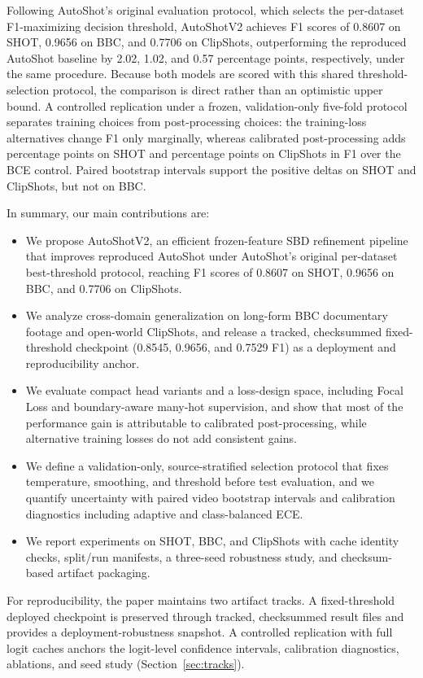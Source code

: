 Following AutoShot's original evaluation protocol, which selects the per-dataset F1-maximizing decision threshold, AutoShotV2 achieves F1 scores of 0.8607 on SHOT, 0.9656 on BBC, and 0.7706 on ClipShots, outperforming the reproduced AutoShot baseline by 2.02, 1.02, and 0.57 percentage points, respectively, under the same procedure. Because both models are scored with this shared threshold-selection protocol, the comparison is direct rather than an optimistic upper bound. A controlled replication under a frozen, validation-only five-fold protocol separates training choices from post-processing choices: the training-loss alternatives change F1 only marginally, whereas calibrated post-processing adds \PaperBFourVsAOneShotPP{} percentage points on SHOT and \PaperBFourVsAOneClipPP{} percentage points on ClipShots in F1 over the BCE control. Paired bootstrap intervals support the positive deltas on SHOT and ClipShots, but not on BBC.

In summary, our main contributions are:
\begin{itemize}
\item We propose AutoShotV2, an efficient frozen-feature SBD refinement pipeline that improves reproduced AutoShot under AutoShot's original per-dataset best-threshold protocol, reaching F1 scores of 0.8607 on SHOT, 0.9656 on BBC, and 0.7706 on ClipShots.
\item We analyze cross-domain generalization on long-form BBC documentary footage and open-world ClipShots, and release a tracked, checksummed fixed-threshold checkpoint (0.8545, 0.9656, and 0.7529 F1) as a deployment and reproducibility anchor.
\item We evaluate compact head variants and a loss-design space, including Focal Loss and boundary-aware many-hot supervision, and show that most of the performance gain is attributable to calibrated post-processing, while alternative training losses do not add consistent gains.
\item We define a validation-only, source-stratified selection protocol that fixes temperature, smoothing, and threshold before test evaluation, and we quantify uncertainty with paired video bootstrap intervals and calibration diagnostics including adaptive and class-balanced ECE.
\item We report experiments on SHOT, BBC, and ClipShots with cache identity checks, split/run manifests, a three-seed robustness study, and checksum-based artifact packaging.
\end{itemize}

For reproducibility, the paper maintains two artifact tracks. A fixed-threshold deployed checkpoint is preserved through tracked, checksummed result files and provides a deployment-robustness snapshot. A controlled replication with full logit caches anchors the logit-level confidence intervals, calibration diagnostics, ablations, and seed study (Section~\ref{sec:tracks}).
